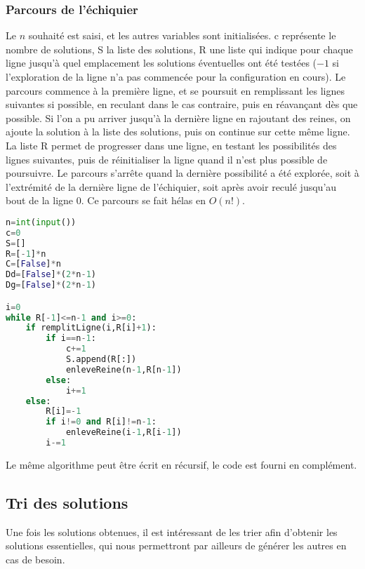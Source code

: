 \documentclass[a4paper]{article}
\begin{document}
\subsubsection{Parcours de l'échiquier}
Le $n$ souhaité est saisi, et les autres variables sont initialisées. c représente le nombre de solutions, S la liste des solutions, R une liste qui indique pour chaque ligne jusqu'à quel emplacement les solutions éventuelles ont été testées ($-1$ si l'exploration de la ligne n'a pas commencée pour la configuration en cours). Le parcours commence à la première ligne, et se poursuit en remplissant les lignes suivantes si possible, en reculant dans le cas contraire, puis en réavançant dès que possible. Si l'on a pu arriver jusqu'à la dernière ligne en rajoutant des reines, on ajoute la solution à la liste des solutions, puis on continue sur cette même ligne. La liste R permet de progresser  dans une ligne, en testant les possibilités des lignes suivantes, puis de réinitialiser la ligne quand il n'est plus possible de poursuivre. Le parcours s'arrête quand la dernière possibilité a été explorée, soit à l'extrémité de la dernière ligne de l'échiquier, soit après avoir reculé jusqu'au bout de la ligne $0$. Ce parcours se fait hélas en $O(n!)$.
\begin{lstlisting}[language=Python,keywordstyle=\color{blue},stringstyle=\color{red},commentstyle=\color{green}]
n=int(input())
c=0
S=[]
R=[-1]*n
C=[False]*n
Dd=[False]*(2*n-1)
Dg=[False]*(2*n-1)

i=0
while R[-1]<=n-1 and i>=0:
    if remplitLigne(i,R[i]+1):
        if i==n-1:
            c+=1
            S.append(R[:])
            enleveReine(n-1,R[n-1])
        else:
            i+=1
    else:
        R[i]=-1
        if i!=0 and R[i]!=n-1:
            enleveReine(i-1,R[i-1])
        i-=1
\end{lstlisting}

Le même algorithme peut être écrit en récursif, le code est fourni en complément.

\subsection{Tri des solutions}
Une fois les solutions obtenues, il est intéressant de les trier afin d'obtenir les solutions essentielles, qui nous permettront par ailleurs de générer les autres en cas de besoin.
\end{document}
